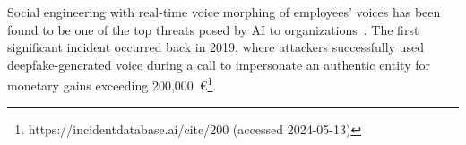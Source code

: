 
Social engineering with real-time voice morphing of employees' voices has been found to be one of the top threats posed by AI to organizations~\citep{mirsky_Threat_Offensive_AI_Organizations_2023}. The first significant incident occurred back in 2019, where attackers successfully used deepfake-generated voice during a call to impersonate an authentic entity for monetary gains exceeding 200,000~€\footnote{https://incidentdatabase.ai/cite/200 (accessed 2024-05-13)}.











